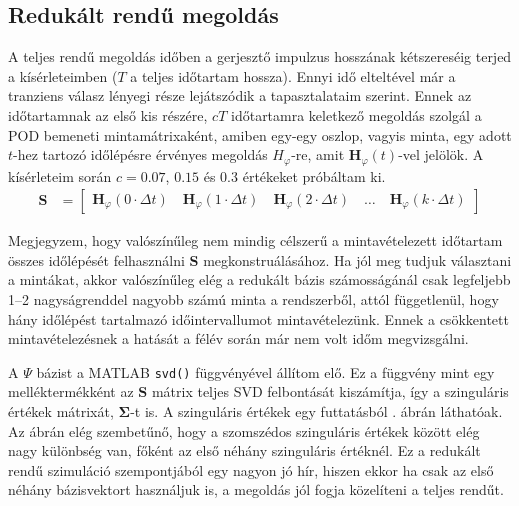         \subsection{Redukált rendű megoldás}
            A teljes rendű megoldás időben a gerjesztő impulzus hosszának kétszereséig terjed a kísérleteimben ($T$ a teljes időtartam hossza). Ennyi idő elteltével már a tranziens válasz lényegi része lejátszódik a tapasztalataim szerint. Ennek az időtartamnak az első kis részére, $cT$ időtartamra keletkező megoldás szolgál a POD bemeneti mintamátrixaként, amiben egy-egy oszlop, vagyis minta, egy adott $t$-hez tartozó időlépésre érvényes megoldás $H_{\varphi}$-re, amit $\textbf{H}_{\varphi}(t)$-vel jelölök. A kísérleteim során $c=\num{0,07}$, $\num{0,15}$ és $\num{0,3}$ értékeket próbáltam ki.
            \begin{equation}\label{equ:minta}
                \begin{aligned}
                    \textbf{S} &= \begin{bmatrix}
                        \textbf{H}_{\varphi}(0\cdot\Delta t)\quad
                        \textbf{H}_{\varphi}(1\cdot\Delta t)\quad
                        \textbf{H}_{\varphi}(2\cdot\Delta t)\quad
                        \hdots\quad
                        \textbf{H}_{\varphi}(k\cdot\Delta t) \end{bmatrix}
                \end{aligned}
            \end{equation}
            \par
            Megjegyzem, hogy valószínűleg nem mindig célszerű a mintavételezett időtartam összes időlépését felhasználni $\textbf{S}$ megkonstruálásához. Ha jól meg tudjuk választani a mintákat, akkor valószínűleg elég a redukált bázis számosságánál csak legfeljebb \qtyrange{1}{2}{} nagyságrenddel nagyobb számú minta a rendszerből, attól függetlenül, hogy hány időlépést tartalmazó időintervallumot mintavételezünk. Ennek a csökkentett mintavételezésnek a hatását a félév során már nem volt időm megvizsgálni.
            \par
            A $\Psi$ bázist a MATLAB \verb|svd()| függvényével állítom elő. Ez a függvény mint egy melléktermékként az $\textbf{S}$ mátrix teljes SVD felbontását kiszámítja, így a szinguláris értékek mátrixát, $\mathbf{\Sigma}$-t is. A szinguláris értékek egy futtatásból . ábrán láthatóak. Az ábrán elég szembetűnő, hogy a szomszédos szinguláris értékek között elég nagy különbség van, főként az első néhány szinguláris értéknél. Ez a redukált rendű szimuláció szempontjából egy nagyon jó hír, hiszen ekkor ha csak az első néhány bázisvektort használjuk is, a megoldás jól fogja közelíteni a teljes rendűt.
